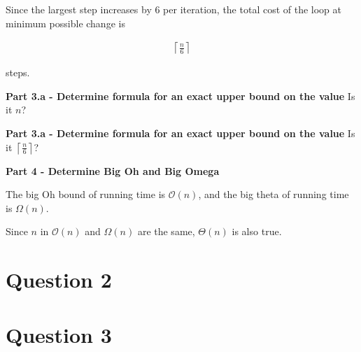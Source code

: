 \documentclass[12pt]{article}
\begin{document}
\begin{enumerate}[a.]
    Since the largest step increases by 6 per iteration, the total cost of the
    loop at minimum possible change is

    \begin{align}
        \left\lceil \frac{n}{6} \right\rceil
    \end{align}

    steps.

    \textbf{Part 3.a - Determine formula for an exact upper bound on the value}
    Is it $n$?

    \textbf{Part 3.a - Determine formula for an exact upper bound on the value}
    Is it $\left\lceil \frac{n}{6} \right\rceil$?

    \textbf{Part 4 - Determine Big Oh and Big Omega}

    The big Oh bound of running time is $\mathcal{O}(n)$, and the big theta of
    running time is $\Omega(n)$.

    \bigskip

    Since $n$ in $\mathcal{O}(n)$ and  $\Omega(n)$ are the same, $\Theta(n)$ is
    also true.

\end{enumerate}

\section*{Question 2}

\section*{Question 3}
\end{document}
